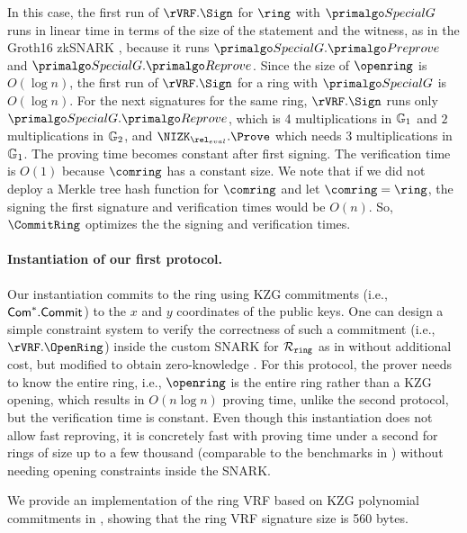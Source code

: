 In this case, the first run of $\rVRF.\Sign$ for $\ring$ with $ \SpecialG $ runs in linear time in terms of the size of the statement and the witness, as in the Groth16 zkSNARK \cite{Groth16}, because it runs $ \SpecialG.\Preprove $ and $ \SpecialG.\Reprove $. Since the size of $ \openring $ is
$ O(\log n) $, the first run of $\rVRF.\Sign$ for a ring with $ \SpecialG $ is $ O(\log n) $.
For the next signatures for the same ring,  $\rVRF.\Sign$  runs only  $\SpecialG.\Reprove$, which is 4 multiplications in $\mathbb{G}_1 $ and $2$ multiplications in $\mathbb{G}_2$, and  $\NIZK_{\rel_{eval}}.\Prove$ which needs  3 multiplications in $ \mathbb{G}_1 $.  The proving time becomes constant after first signing. 
The verification time is $ O(1) $ because $ \comring $ has a constant size.
We note that if we did not deploy a Merkle tree hash function for $ \comring $ and let $ \comring = \ring $, the signing the first signature and verification times would be $ O(n) $. So, $ \CommitRing $ optimizes the the signing and verification times.

\paragraph{Instantiation of our first protocol.}  Our instantiation commits to the ring using KZG commitments (i.e., $ \mathsf{Com}^*.\mathsf{Commit} $) to the $ x $ and $ y $ coordinates of the public keys.
One can design a simple constraint system to verify the correctness of such a commitment (i.e., $ \rVRF.\OpenRing $) inside the custom SNARK for $\mathcal{R}_{\mathtt{ring}}$ as in \cite{accountable} without additional cost, but  modified to obtain zero-knowledge \cite{plonk}.  For this protocol, the prover needs to know the entire ring, i.e., $\openring$ is the entire ring rather than a KZG opening, which results in $O(n \log n)$ proving time, unlike the second protocol, but the verification time is constant. Even though this instantiation  does not allow fast reproving,  it is concretely fast with proving time under a second for rings of size up to a few thousand (comparable to the benchmarks in \cite{accountable}) without needing opening constraints inside the SNARK. 

We provide an implementation of the ring VRF based on KZG polynomial commitments in \cite{implementation}, showing that the ring VRF signature size is 560 bytes.